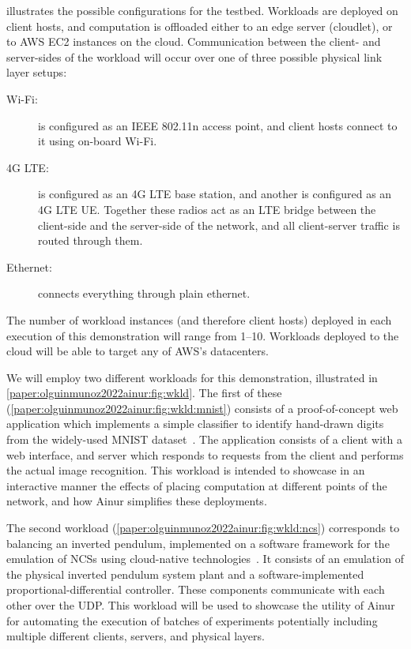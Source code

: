  illustrates the possible configurations for the testbed.
Workloads are deployed on client hosts, and computation is offloaded either to an edge server (cloudlet), or to \gls{AWS} \gls{EC2} instances on the cloud.
Communication between the client- and server-sides of the workload will occur over one of three possible physical link layer setups:
\begin{description}
    \item[Wi-Fi:]  is configured as an IEEE 802.11n access point, and client hosts connect to it using on-board Wi-Fi.
    \item[4G \gls{LTE}:]  is configured as an 4G \gls{LTE} base station, and another is configured as an 4G \gls{LTE} \gls{UE}.
    Together these radios act as an \gls{LTE} bridge between the client-side and the server-side of the network, and all client-server traffic is routed through them.
    \item[Ethernet:] connects everything through plain ethernet.
\end{description}

The number of workload instances (and therefore client hosts) deployed in each execution of this demonstration will range from \numrange[]{1}{10}.
Workloads deployed to the cloud will be able to target any of \gls{AWS}'s datacenters.

We will employ two different workloads for this demonstration, illustrated in \cref{paper:olguinmunoz2022ainur:fig:wkld}.
The first of these (\cref{paper:olguinmunoz2022ainur:fig:wkld:mnist}) consists of a proof-of-concept web application which implements a simple classifier to identify hand-drawn digits from the widely-used \gls{MNIST} dataset~\cite{deng2012mnist}.
The application consists of a client with a web interface, and  server which responds to requests from the client and performs the actual image recognition.
This workload is intended to showcase in an interactive manner the effects of placing computation at different points of the network, and how Ainur simplifies these deployments.

The second workload (\cref{paper:olguinmunoz2022ainur:fig:wkld:ncs}) corresponds to  balancing an inverted pendulum, implemented on a software framework for the emulation of \glspl{NCS} using cloud-native technologies~\cite{olguinmunoz2022cleave}.
It consists of an emulation of the physical inverted pendulum system plant and a software-implemented proportional-differential controller.
These components communicate with each other over the \gls{UDP}.
This workload will be used to showcase the utility of Ainur for automating the execution of batches of experiments potentially including multiple different clients, servers, and physical layers.


